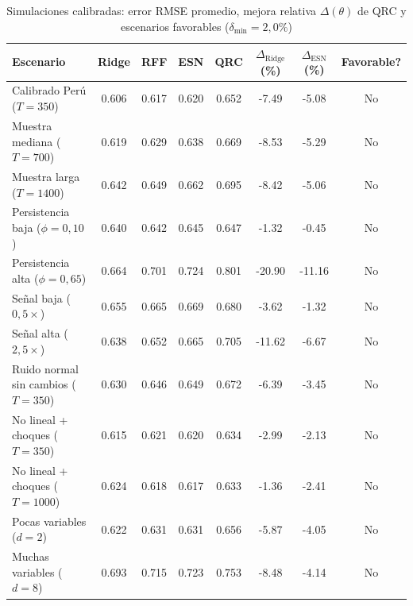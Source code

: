 \begin{table}[htbp]
	\centering
	\caption{Simulaciones calibradas: error RMSE promedio, mejora relativa \(\Delta(\theta)\) de QRC y escenarios favorables (\(\delta_{\min}=2{,}0\%\))}
	\label{tab:etapa6_sintetico}
	\footnotesize
	\renewcommand{\arraystretch}{1.12}
	\begin{tabular}{@{}>{\raggedright\arraybackslash}p{3.9cm}S[table-format=1.3]S[table-format=1.3]S[table-format=1.3]S[table-format=1.3]S[table-format=-2.2]S[table-format=-2.2]c@{}}
		\toprule
		Escenario & {Ridge} & {RFF} & {ESN} & {QRC} & {\(\Delta_{\text{Ridge}}\) (\%)} & {\(\Delta_{\text{ESN}}\) (\%)} & {Favorable?}\\
		\midrule
		Calibrado Perú (\(T=350\)) & 0.606 & 0.617 & 0.620 & 0.652 & -7.49 & -5.08 & No\\
		Muestra mediana (\(T=700\)) & 0.619 & 0.629 & 0.638 & 0.669 & -8.53 & -5.29 & No\\
		Muestra larga (\(T=1400\)) & 0.642 & 0.649 & 0.662 & 0.695 & -8.42 & -5.06 & No\\
		Persistencia baja (\(\phi=0{,}10\)) & 0.640 & 0.642 & 0.645 & 0.647 & -1.32 & -0.45 & No\\
		Persistencia alta (\(\phi=0{,}65\)) & 0.664 & 0.701 & 0.724 & 0.801 & -20.90 & -11.16 & No\\
		Señal baja (\(0{,}5\times\)) & 0.655 & 0.665 & 0.669 & 0.680 & -3.62 & -1.32 & No\\
		Señal alta (\(2{,}5\times\)) & 0.638 & 0.652 & 0.665 & 0.705 & -11.62 & -6.67 & No\\
		Ruido normal sin cambios (\(T=350\)) & 0.630 & 0.646 & 0.649 & 0.672 & -6.39 & -3.45 & No\\
		No lineal + choques (\(T=350\)) & 0.615 & 0.621 & 0.620 & 0.634 & -2.99 & -2.13 & No\\
		No lineal + choques (\(T=1000\)) & 0.624 & 0.618 & 0.617 & 0.633 & -1.36 & -2.41 & No\\
		Pocas variables (\(d=2\)) & 0.622 & 0.631 & 0.631 & 0.656 & -5.87 & -4.05 & No\\
		Muchas variables (\(d=8\)) & 0.693 & 0.715 & 0.723 & 0.753 & -8.48 & -4.14 & No\\
		\bottomrule
	\end{tabular}
\end{table}

